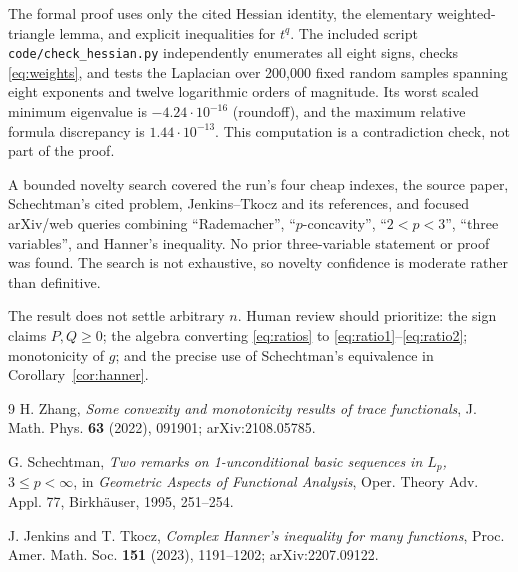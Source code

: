 \documentclass[11pt]{article}
\begin{document}
The formal proof uses only the cited Hessian identity, the elementary
weighted-triangle lemma, and explicit inequalities for $t^q$.  The included
script \texttt{code/check\_hessian.py} independently enumerates all eight
signs, checks \eqref{eq:weights}, and tests the Laplacian over 200,000 fixed
random samples spanning eight exponents and twelve logarithmic orders of
magnitude.  Its worst scaled minimum eigenvalue is
$-4.24\cdot10^{-16}$ (roundoff), and the maximum relative formula discrepancy
is $1.44\cdot10^{-13}$.  This computation is a contradiction check, not part
of the proof.

A bounded novelty search covered the run's four cheap indexes, the source
paper, Schechtman's cited problem, Jenkins--Tkocz and its references, and
focused arXiv/web queries combining ``Rademacher'', ``$p$-concavity'',
``$2<p<3$'', ``three variables'', and Hanner's inequality.  No prior
three-variable statement or proof was found.  The search is not exhaustive,
so novelty confidence is moderate rather than definitive.

The result does not settle arbitrary $n$.  Human review should prioritize:
the sign claims $P,Q\geq0$; the algebra converting \eqref{eq:ratios} to
\eqref{eq:ratio1}--\eqref{eq:ratio2}; monotonicity of $g$; and the precise use
of Schechtman's equivalence in Corollary~\ref{cor:hanner}.

\begin{thebibliography}{9}
H. Zhang,
\emph{Some convexity and monotonicity results of trace functionals},
J. Math. Phys. \textbf{63} (2022), 091901; arXiv:2108.05785.

G. Schechtman,
\emph{Two remarks on 1-unconditional basic sequences in $L_p$, $3\leq p<\infty$},
in \emph{Geometric Aspects of Functional Analysis},
Oper. Theory Adv. Appl. 77, Birkh\"auser, 1995, 251--254.

J. Jenkins and T. Tkocz,
\emph{Complex Hanner's inequality for many functions},
Proc. Amer. Math. Soc. \textbf{151} (2023), 1191--1202;
arXiv:2207.09122.
\end{thebibliography}
\end{document}
